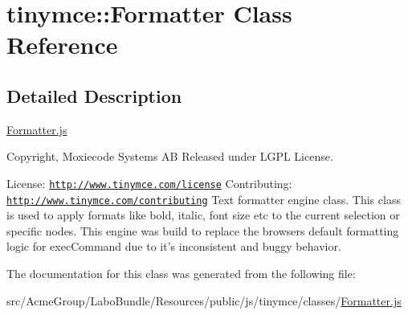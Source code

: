 \hypertarget{classtinymce_1_1_formatter}{\section{tinymce\+:\+:Formatter Class Reference}
\label{classtinymce_1_1_formatter}
}


\subsection{Detailed Description}
\hyperlink{_formatter_8js}{Formatter.\+js}

Copyright, Moxiecode Systems A\+B Released under L\+G\+P\+L License.

License\+: \href{http://www.tinymce.com/license}{\tt http\+://www.\+tinymce.\+com/license} Contributing\+: \href{http://www.tinymce.com/contributing}{\tt http\+://www.\+tinymce.\+com/contributing} Text formatter engine class. This class is used to apply formats like bold, italic, font size etc to the current selection or specific nodes. This engine was build to replace the browsers default formatting logic for exec\+Command due to it's inconsistent and buggy behavior. 

The documentation for this class was generated from the following file\+:\begin{DoxyCompactItemize}
\item 
src/\+Acme\+Group/\+Labo\+Bundle/\+Resources/public/js/tinymce/classes/\hyperlink{_formatter_8js}{Formatter.\+js}\end{DoxyCompactItemize}
